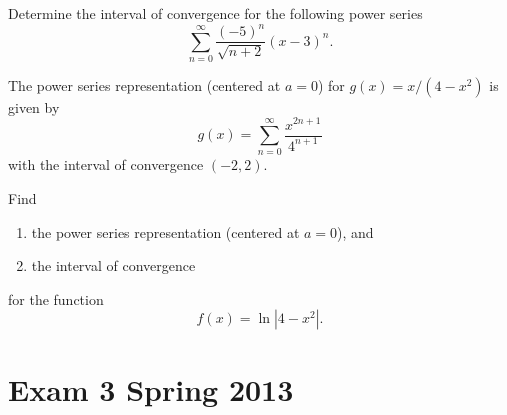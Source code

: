 \begin{problem}
Determine the interval of convergence for the following power series
\[
\sum_{n=0}^\infty\frac{(-5)^n}{\sqrt{n+2}}(x-3)^n.
\]
\end{problem}
\begin{problem}
The power series representation (centered at $a=0$) for $g(x)=x/(4-x^2)$ is
given by
\[
g(x)=\sum_{n=0}^\infty\frac{x^{2n+1}}{4^{n+1}}
\]
with the interval of convergence $(-2,2)$.

Find
\begin{enumerate}[label=(\alph*)]
\item the power series representation (centered at $a=0$), and
\item the interval of convergence
\end{enumerate}
for the function
\[
f(x)=\ln|4-x^2|.
\]
\end{problem}
\section{Exam 3 Spring 2013}
\setcounter{exercise}{0}

